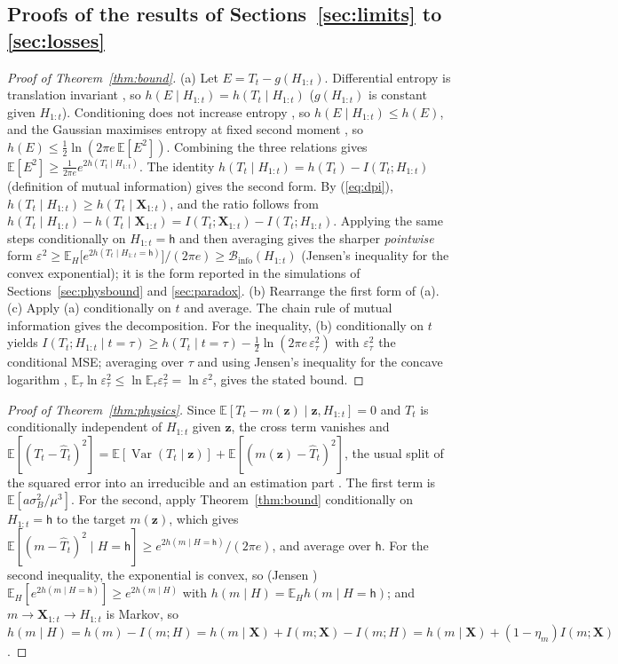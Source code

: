 \documentclass[preprint,12pt]{elsarticle}
\theoremstyle{definition}
\newcommand{\E}{\mathbb{E}}
\newcommand{\Binfo}{\mathcal{B}_{\mathrm{info}}}
\DeclareMathOperator{\Var}{Var}
\begin{document}
\subsection{Proofs of the results of Sections~\ref{sec:limits} to \ref{sec:losses}}
\begin{proof}[Proof of Theorem~\ref{thm:bound}]
(a) Let $E=T_t-g(H_{1:t})$. Differential entropy is translation invariant \cite[Sect.~8.6]{cover2006}, so $h(E\mid H_{1:t})=h(T_t\mid H_{1:t})$ ($g(H_{1:t})$ is constant given $H_{1:t}$). Conditioning does not increase entropy \cite[Sect.~2.6]{cover2006}, so $h(E\mid H_{1:t})\le h(E)$, and the Gaussian maximises entropy at fixed second moment \cite[Sect.~8.6]{cover2006}, so $h(E)\le \tfrac12\ln(2\pi e\,\E[E^2])$. Combining the three relations gives $\E[E^2]\ge \frac{1}{2\pi e}e^{2h(T_t\mid H_{1:t})}$. The identity $h(T_t\mid H_{1:t})=h(T_t)-I(T_t;H_{1:t})$ (definition of mutual information) gives the second form. By (\ref{eq:dpi}), $h(T_t\mid H_{1:t})\ge h(T_t\mid\mathbf{X}_{1:t})$, and the ratio follows from $h(T_t\mid H_{1:t})-h(T_t\mid \mathbf{X}_{1:t})=I(T_t;\mathbf{X}_{1:t})-I(T_t;H_{1:t})$. Applying the same steps conditionally on $H_{1:t}=\mathsf h$ and then averaging gives the sharper \emph{pointwise} form $\varepsilon^2\ge\E_H\big[e^{2h(T_t\mid H_{1:t}=\mathsf h)}\big]/(2\pi e)\ge\Binfo(H_{1:t})$ (Jensen's inequality for the convex exponential); it is the form reported in the simulations of Sections~\ref{sec:physbound} and \ref{sec:paradox}.
(b) Rearrange the first form of (a). (c) Apply (a) conditionally on $t$ and average. The chain rule of mutual information \cite[Sect.~2.5]{cover2006} gives the decomposition. For the inequality, (b) conditionally on $t$ yields $I(T_t;H_{1:t}\mid t=\tau)\ge h(T_t\mid t=\tau)-\tfrac12\ln(2\pi e\,\varepsilon_\tau^2)$ with $\varepsilon_\tau^2$ the conditional MSE; averaging over $\tau$ and using Jensen's inequality for the concave logarithm \cite[Sect.~2.6]{cover2006}, $\E_\tau\ln\varepsilon_\tau^2\le\ln\E_\tau\varepsilon_\tau^2=\ln\varepsilon^2$, gives the stated bound.
\end{proof}

\begin{proof}[Proof of Theorem~\ref{thm:physics}]
Since $\E[T_t-m(\mathbf z)\mid\mathbf z,H_{1:t}]=0$ and $T_t$ is conditionally independent of $H_{1:t}$ given $\mathbf z$, the cross term vanishes and
$\E[(T_t-\hat T_t)^2]=\E[\Var(T_t\mid\mathbf z)]+\E[(m(\mathbf z)-\hat T_t)^2]$, the usual split of the squared error into an irreducible and an estimation part \cite[Sect.~1.5.5]{bishop2006}. The first term is $\E[a\sigma_B^2/\mu^3]$. For the second, apply Theorem~\ref{thm:bound} conditionally on $H_{1:t}=\mathsf{h}$ to the target $m(\mathbf z)$, which gives $\E[(m-\hat T_t)^2\mid H=\mathsf{h}]\ge e^{2h(m\mid H=\mathsf{h})}/(2\pi e)$, and average over $\mathsf{h}$. For the second inequality, the exponential is convex, so (Jensen \cite[Sect.~2.6]{cover2006}) $\E_H[e^{2h(m\mid H=\mathsf{h})}]\ge e^{2h(m\mid H)}$ with $h(m\mid H)=\E_H h(m\mid H=\mathsf{h})$; and $m\to\mathbf{X}_{1:t}\to H_{1:t}$ is Markov, so $h(m\mid H)=h(m)-I(m;H)=h(m\mid\mathbf{X})+I(m;\mathbf{X})-I(m;H)=h(m\mid\mathbf{X})+(1-\eta_m)I(m;\mathbf{X})$.
\end{proof}
\end{document}

